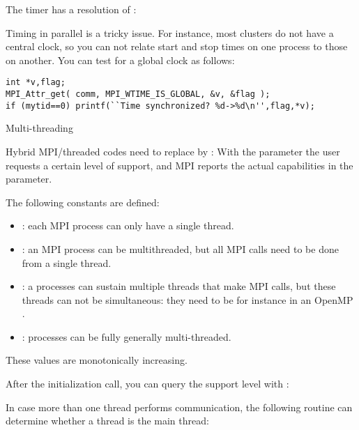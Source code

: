 The timer has a resolution of :
%

Timing in parallel is a tricky issue. For instance, most clusters do
not have a central clock, so you can not relate start and stop times
on one process to those on another. You can test for a global clock as
follows:
\begin{verbatim}
int *v,flag;
MPI_Attr_get( comm, MPI_WTIME_IS_GLOBAL, &v, &flag );
if (mytid==0) printf(``Time synchronized? %d->%d\n'',flag,*v);
\end{verbatim}


 {Multi-threading}

Hybrid MPI/threaded codes need to replace 
by :
%
%
With the  parameter the user requests a certain level of support,
and MPI reports the actual capabilities in the  parameter.

The following constants are defined:
\begin{itemize}
\item {}: each MPI process can only have
  a single thread.
\item {}: an MPI process can be
  multithreaded, but all MPI calls need to be done from a single
  thread.
\item {}: a processes can sustain
  multiple threads that make MPI calls, but these threads can not be
  simultaneous: they need to be for instance in an OpenMP
  .
\item {}: processes can be fully
  generally multi-threaded.
\end{itemize}
These values are monotonically increasing.

After the initialization call, you can query the support level
with :
%

In case more than one thread performs communication, the following routine
can determine whether a thread is the main thread:
%
